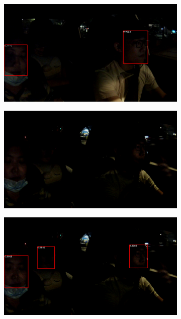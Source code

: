 \begin{figure}[t]
\begin{subfigure}[b]{0.45\textwidth}
\end{subfigure}
\begin{subfigure}[b]{0.45\textwidth}
    \includegraphics[width=\textwidth]{figures/comp_ours2}
\end{subfigure}
\begin{subfigure}[b]{0.45\textwidth}
    \includegraphics[width=\textwidth]{figures/comp_base3}
\end{subfigure}
\begin{subfigure}[b]{0.45\textwidth}
    \includegraphics[width=\textwidth]{figures/comp_ours3}

\end{subfigure}
\end{figure}
